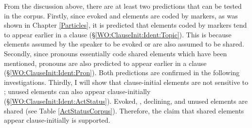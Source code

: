 %
%
%

From the discussion above,
there are at least two predictions that can be tested in the corpus.
Firstly, since evoked and  elements are coded by  markers, as was shown in Chapter \ref{Particles},
it is predicted that
elements coded by  markers tend to appear earlier in a clause (\S \ref{WO:ClauseInit:Ident:Topic}).
This is because elements assumed by the speaker to be evoked or 
are also assumed to be shared.
Secondly,
since pronouns essentially code shared elements which have been mentioned,
pronouns are also predicted to appear earlier in a clause (\S \ref{WO:ClauseInit:Ident:Pron}).
Both predictions are confirmed in the following investigations.
Thirdly, I will show that clause-initial elements are not sensitive to ;
unused elements can also appear clause-initially (\S \ref{WO:ClauseInit:Ident:ActStatus}).
Evoked, , declining, and unused elements are shared
(see Table \ref{ActStatusCorpus}).
Therefore, the claim that shared elements appear clause-initially is supported.

